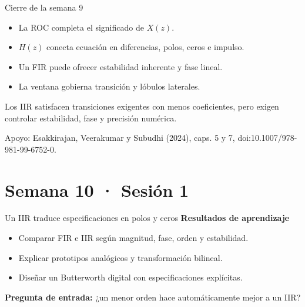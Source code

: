 \documentclass[
  ignorenonframetext,
  aspectratio=169,
  spanish,
  professionalfonts]{beamer}
\providecommand{\tightlist}{%
  \setlength{\itemsep}{0pt}\setlength{\parskip}{0pt}}
\begin{document}
\begin{frame}{Cierre de la semana 9}
\protect{}\label{cierre-de-la-semana-9}
\begin{itemize}
\tightlist
\item
  La ROC completa el significado de \(X(z)\).
\item
  \(H(z)\) conecta ecuación en diferencias, polos, ceros e impulso.
\item
  Un FIR puede ofrecer estabilidad inherente y fase lineal.
\item
  La ventana gobierna transición y lóbulos laterales.
\end{itemize}

\begin{tcolorbox}[enhanced jigsaw, arc=.35mm, bottomrule=.15mm, bottomtitle=1mm, breakable, colback=white, colbacktitle=quarto-callout-important-color!10!white, colframe=quarto-callout-important-color-frame, coltitle=black, left=2mm, leftrule=.75mm, opacityback=0, opacitybacktitle=0.6, rightrule=.15mm, title={Puente a la semana 10}, titlerule=0mm, toprule=.15mm, toptitle=1mm]

Los IIR satisfacen transiciones exigentes con menos coeficientes, pero
exigen controlar estabilidad, fase y precisión numérica.

\end{tcolorbox}

Apoyo: Esakkirajan, Veerakumar y Subudhi (2024), caps. 5 y 7,
doi:10.1007/978-981-99-6752-0.
\end{frame}

\section{Semana 10 · Sesión 1}\label{semana-10-sesiuxf3n-1}

\begin{frame}{Un IIR traduce especificaciones en polos y ceros}
\protect{}\label{un-iir-traduce-especificaciones-en-polos-y-ceros}
\textbf{Resultados de aprendizaje}

\begin{itemize}
\tightlist
\item
  Comparar FIR e IIR según magnitud, fase, orden y estabilidad.
\item
  Explicar prototipos analógicos y transformación bilineal.
\item
  Diseñar un Butterworth digital con especificaciones explícitas.
\end{itemize}

\textbf{Pregunta de entrada:} ¿un menor orden hace automáticamente mejor
a un IIR?
\end{frame}
\end{document}
